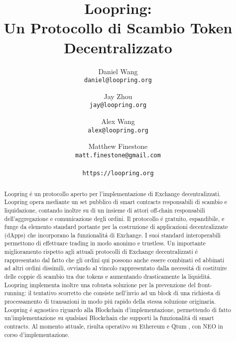 \documentclass[UTF8,nofonts]{article}
\title{\textbf{Loopring:}\\\textbf{Un Protocollo di Scambio Token Decentralizzato}}
\author{
  Daniel Wang\\
  \texttt{daniel@loopring.org}\\
  \and
  	Jay Zhou\\
  	\texttt{jay@loopring.org}\\
  	\and
  	Alex Wang\\
  	\texttt{alex@loopring.org}\\
  	\and
  	Matthew Finestone\\
  	\texttt{matt.finestone@gmail.com}\\
  \\
  \texttt{https://loopring.org}
 }
\begin{document}
\maketitle


\begin{abstract}
Loopring \'e un protocollo aperto per l'implementazione di Exchange decentralizzati. Loopring opera mediante un set pubblico di smart contracts responsabili di scambio e liquidazione, contando inoltre su di un insieme di attori off-chain responsabili dell'aggregazione e comunicazione degli ordini. Il protocollo \'e gratuito, espandibile, e funge da elemento standard portante per la costruzione di applicazioni decentralizzate (dApps) che incorporano la funzionalit\'a di Exchange. I suoi standard interoperabili permettono di effettuare trading in modo anonimo e trustless. Un importante miglioramento rispetto agli attuali protocolli di Exchange decentralizzati \'e rappresentato dal fatto che gli ordini qui possono anche essere combinati ed abbinati ad altri ordini dissimili, ovviando al vincolo rappresentato dalla necessit\'a di costituire delle coppie di scambio tra due tokens e aumentando drasticamente la liquidit\'a. Loopring implementa inoltre una robusta soluzione per la prevenzione del front-running: il tentativo scorretto che consiste nell'invio ad un block di una richiesta di processamento di transazioni in modo pi\'u rapido della stessa soluzione originaria. Loopring \'e agnostico riguardo alla Blockchain d'implementazione, permettendo di fatto un'implementazione su qualsiasi Blockchain che supporti la funzionalit\'a di smart contracts. Al momento attuale, risulta operativo su Ethereum \cite{buterin2017ethereum} \cite{wood2014ethereum} e Qtum \cite{dai2017smart}, con NEO \cite{atterlonn2018distributed} in corso d'implementazione.

\end{abstract}
\end{document}
